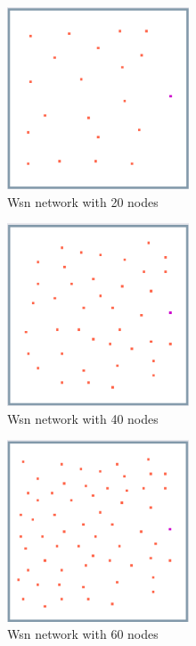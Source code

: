 \begin{figure}[H]
  \centering
    \includegraphics[width=0.48\textwidth]{wsn_20_exp/1_wsn_20}%
    
  \caption{Wsn network with 20 nodes}
  \label{fig:wsn_20_exp/1_wsn_20}
\end{figure}

\begin{figure}[H]
  \centering
    \includegraphics[width=0.48\textwidth]{wsn_40_exp/1_wsn_40}%
    
  \caption{Wsn network with 40 nodes}
  \label{fig:wsn_40_exp/1_wsn_40}
\end{figure}

\begin{figure}[H]
  \centering
    \includegraphics[width=0.48\textwidth]{wsn_60_exp/1_wsn_60}%
    
  \caption{Wsn network with 60 nodes}
  \label{fig:wsn_60_exp/1_wsn_60}
\end{figure}

